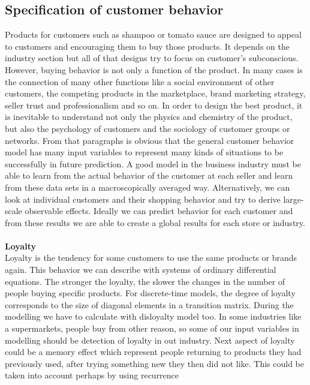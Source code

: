 \subsection{Specification of customer behavior} \label{subsec:specification}
Products for customers such as shampoo or tomato sauce are designed to appeal to customers and encouraging them to buy those products.
It depends on the industry section but all of that designs try to focus on customer’s subconscious.
However, buying behavior is not only a function of the product.
In many cases is the connection of many other functions like a social environment of other customers, the competing products in the marketplace,
brand marketing strategy, seller trust and professionalism and so on.
In order to design the best product, it is inevitable to understand not only the physics and chemistry of the product,
but also the psychology of customers and the sociology of customer groups or networks\cite{patel}.
From that paragraphs is obvious that the general customer behavior model has many input variables to represent many
kinds of situations to be successfully in future prediction.
A good model in the business industry must be able to learn from the actual behavior of the customer at each seller and learn from these data sets in a macroscopically averaged way.
Alternatively, we can look at individual customers and their shopping behavior and try to derive large-scale observable effects.
Ideally we can predict behavior for each customer and from these results we are able to create a global results for each store or industry.\\
\\
\textbf{Loyalty} \label{subsec:loyalty}\\
Loyalty is the tendency for some customers to use the same products or brands again.
This behavior we can describe with systems of ordinary differential equations.
The stronger the loyalty, the slower the changes in the number of people buying specific products.
For discrete-time models, the degree of loyalty corresponds to the size of diagonal elements in a transition matrix.
During the modelling we have to calculate with  disloyalty model too.
In some industries like a supermarkets,
people buy from other reason, so some of our input variables in modelling should be detection of loyalty in out industry.
Next aspect of loyalty could be a memory effect which represent people returning to products they had previously used,
after trying something new they then did not like.
This could be taken into account perhaps by using recurrence
